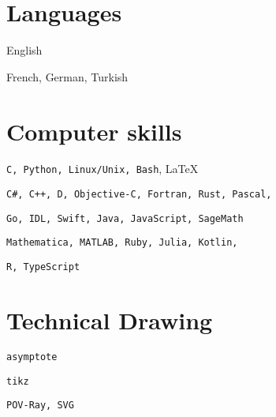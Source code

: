 \documentclass[a4paper,sans]{moderncv}
\begin{document}
    \section{Languages}
         English\par
         French, German, Turkish
    \section{Computer skills}
        \texttt{C, Python, Linux/Unix, Bash}, \LaTeX\par
        \texttt{C\#, C++, D, Objective-C, Fortran, Rust, Pascal,}\par
        \makebox[2.3cm][l]{\phantom{Intermediate}}
        \texttt{Go, IDL, Swift, Java, JavaScript, SageMath}\par
        \texttt{Mathematica, MATLAB, Ruby, Julia, Kotlin,}\par
        \makebox[2.3cm][l]{\phantom{Elementary}}
        \texttt{R, TypeScript}
    \section{Technical Drawing}
        \texttt{asymptote}\par
        \texttt{tikz}\par
        \texttt{POV-Ray, SVG}
\end{document}
